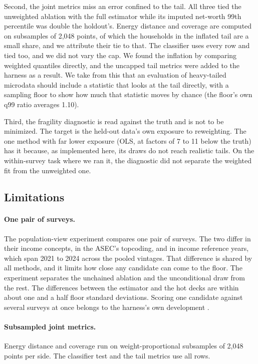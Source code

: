 Second, the joint metrics miss an error confined to the tail. All three
tied the unweighted ablation with the full estimator while its imputed
net-worth 99th percentile was double the holdout's. Energy distance and
coverage are computed on subsamples of 2,048 points, of which the households
in the inflated tail are a small share, and we attribute their tie to that.
The classifier uses every row and tied too, and we did not vary the cap. We
found the inflation by comparing weighted quantiles directly, and the
uncapped tail metrics were added to the harness as a result. We take from
this that an evaluation of heavy-tailed microdata should include a statistic
that looks at the tail directly, with a sampling floor to show how much that
statistic moves by chance (the floor's own q99 ratio averages 1.10).

Third, the fragility diagnostic is read against the truth and is not to be
minimized. The target is the held-out data's own exposure to reweighting.
The one method with far lower exposure (OLS, at factors of 7 to 11 below the
truth) has it because, as implemented here, its draws do not reach realistic
tails. On the within-survey task where we ran it, the diagnostic did not
separate the weighted fit from the unweighted one.

\subsection{Limitations}
\label{sec:limitations}

\paragraph{One pair of surveys.} The population-view experiment compares one
pair of surveys. The two differ in their income concepts, in the ASEC's
topcoding, and in income reference years, which span 2021 to 2024 across the
pooled vintages. That difference is shared by all methods, and it limits how
close any candidate can come to the floor. The experiment separates the
unchained ablation and the unconditional draw from the rest. The differences
between the estimator and the hot decks are within about one and a half
floor standard deviations. Scoring one candidate against several surveys at
once belongs to the harness's own development \citep{ghenis2026popdgp}.

\paragraph{Subsampled joint metrics.} Energy distance and coverage run on
weight-proportional subsamples of 2,048 points per side. The classifier test
and the tail metrics use all rows.

